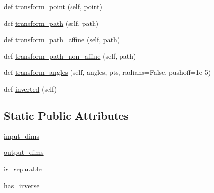\begin{DoxyCompactItemize}
def \hyperlink{classmatplotlib_1_1transforms_1_1Transform_a27944a83583b47754ef882922a00093d}{transform\+\_\+point} (self, point)
\item 
def \hyperlink{classmatplotlib_1_1transforms_1_1Transform_a387a1221c1e91cd48b3c0bada34551ae}{transform\+\_\+path} (self, path)
\item 
def \hyperlink{classmatplotlib_1_1transforms_1_1Transform_a53f9be50f7b90fd84dc10db6dcf5f9e6}{transform\+\_\+path\+\_\+affine} (self, path)
\item 
def \hyperlink{classmatplotlib_1_1transforms_1_1Transform_a3f73b45bb73b28efddbbb8ff6f828c8d}{transform\+\_\+path\+\_\+non\+\_\+affine} (self, path)
\item 
def \hyperlink{classmatplotlib_1_1transforms_1_1Transform_ae40bef230e0a307b714546a64e7b1ede}{transform\+\_\+angles} (self, angles, pts, radians=False, pushoff=1e-\/5)
\item 
def \hyperlink{classmatplotlib_1_1transforms_1_1Transform_a0da24d34489dd79c2dade8c51e2e2582}{inverted} (self)
\end{DoxyCompactItemize}
\subsection*{Static Public Attributes}
\begin{DoxyCompactItemize}
\item 
\hyperlink{classmatplotlib_1_1transforms_1_1Transform_a96d2969a2a9cbc5105534e2c848d0112}{input\+\_\+dims}
\item 
\hyperlink{classmatplotlib_1_1transforms_1_1Transform_a54640edfc4c4cec07e567f82a756f767}{output\+\_\+dims}
\item 
\hyperlink{classmatplotlib_1_1transforms_1_1Transform_af81ccab23877735961f7d384a9947e8c}{is\+\_\+separable}
\item 
\hyperlink{classmatplotlib_1_1transforms_1_1Transform_a9cd7be3f8ed35b38c6a86c8d843121b0}{has\+\_\+inverse}
\end{DoxyCompactItemize}


